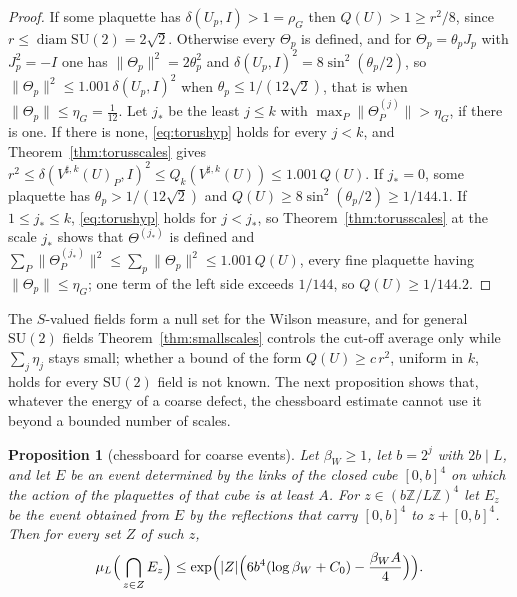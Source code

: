 \documentclass[11pt]{amsart}
\newtheorem{proposition}[theorem]{Proposition}
\theoremstyle{definition}
\theoremstyle{remark}
\numberwithin{equation}{section}
\newcommand{\Z}{\mathbb{Z}}
\newcommand{\SU}{\mathrm{SU}}
\begin{document}
\begin{proof}
If some plaquette has $\delta(U_p,I)>1=\rho_G$ then $Q(U)>1\ge r^2/8$,
since $r\le\operatorname{diam}\SU(2)=2\sqrt2$. Otherwise every $\Theta_p$
is defined, and for $\Theta_p=\theta_pJ_p$ with $J_p^2=-I$ one has
$\lVert\Theta_p\rVert^2=2\theta_p^2$ and $\delta(U_p,I)^2=8\sin^2(\theta_p
/2)$, so $\lVert\Theta_p\rVert^2\le1.001\,\delta(U_p,I)^2$ when $\theta_p
\le1/(12\sqrt2)$, that is when $\lVert\Theta_p\rVert\le\eta_G=\frac1{12}$.
Let $j_*$ be the least $j\le k$ with $\max_P\lVert\Theta^{(j)}_P\rVert>
\eta_G$, if there is one. If there is none, \eqref{eq:torushyp} holds for
every $j<k$, and Theorem~\ref{thm:torusscales} gives $r^2\le\delta(V^{
\sharp,k}(U)_P,I)^2\le Q_k(V^{\sharp,k}(U))\le1.001\,Q(U)$. If $j_*=0$,
some plaquette has $\theta_p>1/(12\sqrt2)$ and $Q(U)\ge8\sin^2(\theta_p/2)
\ge1/144.1$. If $1\le j_*\le k$, \eqref{eq:torushyp} holds for $j<j_*$, so
Theorem~\ref{thm:torusscales} at the scale $j_*$ shows that $\Theta^{(j_*)}$
is defined and $\sum_P\lVert\Theta^{(j_*)}_P\rVert^2\le\sum_p\lVert\Theta_p
\rVert^2\le1.001\,Q(U)$, every fine plaquette having $\lVert\Theta_p\rVert
\le\eta_G$; one term of the left side exceeds $1/144$, so $Q(U)\ge1/144.2$.
\end{proof}

The $S$-valued fields form a null set for the Wilson measure, and for
general $\SU(2)$ fields Theorem~\ref{thm:smallscales} controls the
cut-off average only while $\sum_j\eta_j$ stays small; whether a bound of
the form $Q(U)\ge c\,r^2$, uniform in $k$, holds for every $\SU(2)$ field is
not known. The next proposition shows that, whatever the energy of a
coarse defect, the chessboard estimate cannot use it beyond a bounded
number of scales.

\begin{proposition}[chessboard for coarse events]\label{prop:coarsechess}
Let $\beta_W\ge1$, let $b=2^j$ with $2b\mid L$, and let $E$ be an event
determined by the links of the closed cube $[0,b]^4$ on which the action
of the plaquettes of that cube is at least $A$. For $z\in(b\Z/L\Z)^4$ let
$E_z$ be the event obtained from $E$ by the reflections that carry $[0,b]^4$
to $z+[0,b]^4$. Then for every set $Z$ of such $z$,
\[
\mu_L\Bigl(\,\bigcap_{z\in Z}E_z\Bigr)\le\exp\Bigl(|Z|\Bigl(6b^4(\log\beta_W
+C_0)-\frac{\beta_WA}4\Bigr)\Bigr).
\]
\end{proposition}
\end{document}

